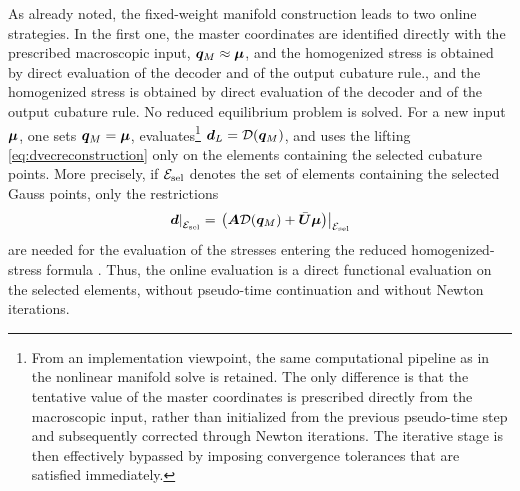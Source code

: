 \documentclass[11pt,a4paper]{article}
\begin{document}
As already noted, the fixed-weight manifold construction leads to two online strategies. In the
first one, the master coordinates are identified  directly with the prescribed
macroscopic input, $\bm{q}_M\approx\bm{\mu}$,
and the homogenized stress is obtained
by direct evaluation of the decoder and of the output cubature rule., and the homogenized stress is obtained
by direct evaluation of the decoder and of the output cubature rule. No reduced
equilibrium problem is solved. For a new input $\bm{\mu}$, one sets
$\bm{q}_M=\bm{\mu}$, evaluates\footnote{From an implementation viewpoint, the same
computational pipeline as in the nonlinear manifold solve is retained. The only
difference is that the tentative value of the master coordinates is prescribed
directly from the macroscopic input, rather than initialized from the previous
pseudo-time step and subsequently corrected through Newton iterations. The
iterative stage is then effectively bypassed by imposing convergence tolerances
that are satisfied immediately.} $\bm{d}_L=\mathcal{\boldsymbol{D}}(\bm{q}_M)$, and uses the lifting
\eqref{eq:dvecreconstruction} only on the elements containing the selected
cubature points. More precisely, if $\mathcal{E}_{\mathrm{sel}}$ denotes the set of elements
containing the selected Gauss points, only the restrictions
\[
    \left.\bm{d}\right|_{\mathcal{E}_{\mathrm{sel}}}
    =
    \left.
    \left(
    \bm{A}\mathcal{\boldsymbol{D}}(\bm{q}_M)+\bar{\bm{U}}\bm{\mu}
    \right)
    \right|_{\mathcal{E}_{\mathrm{sel}}}
\]
are needed for the evaluation of the stresses entering the reduced
homogenized-stress formula . Thus, the online evaluation is a direct functional
evaluation on the selected elements, without pseudo-time continuation and
without Newton iterations.
\end{document}
